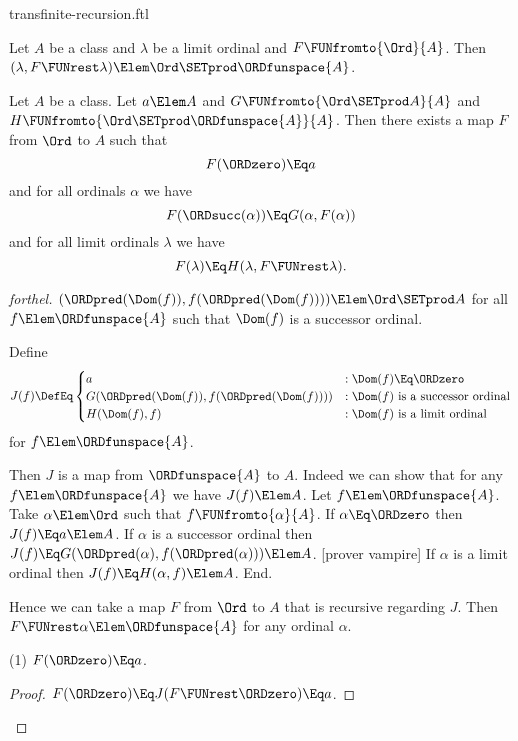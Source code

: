 \documentclass{stex}
\begin{document}
\begin{smodule}{transfinite-recursion.ftl}
\begin{lemma}[forthel]
  Let $A$ be a class and $\lambda$ be a limit ordinal and $F \FUNfromto{\Ord}{A}$.
  Then $(\lambda, F \FUNrest \lambda) \Elem \Ord \SETprod \ORDfunspace{A}$.
\end{lemma}

\begin{corollary}[forthel]
  Let $A$ be a class.
  Let $a \Elem A$ and $G \FUNfromto{\Ord \SETprod A}{A}$ and\linebreak $H \FUNfromto{\Ord \SETprod \ORDfunspace{A}}{A}$.
  Then there exists a map $F$ from $\Ord$ to $A$ such that
  \[ F(\ORDzero) \Eq a \]
  and for all ordinals $\alpha$ we have
  \[ F(\ORDsucc(\alpha)) \Eq G(\alpha, F(\alpha)) \]
  and for all limit ordinals $\lambda$ we have
  \[ F(\lambda) \Eq H(\lambda, F \FUNrest \lambda). \]
\end{corollary}
\begin{proof}[forthel]
  $(\ORDpred(\Dom(f)), f(\ORDpred(\Dom(f)))) \Elem \Ord \SETprod A$ for all $f \Elem \ORDfunspace{A}$ such that $\Dom(f)$ is a successor ordinal.

  Define  \[ J(f) \DefEq
    \begin{cases}
      a
      & : \Dom(f) \Eq \ORDzero
      \\
      G(\ORDpred(\Dom(f)), f(\ORDpred(\Dom(f))))
      & : \text{$\Dom(f)$ is a successor ordinal}
      \\
      H(\Dom(f), f)
      & : \text{$\Dom(f)$ is a limit ordinal}
    \end{cases} \]
  for $f \Elem \ORDfunspace{A}$.

  Then $J$ is a map from $\ORDfunspace{A}$ to $A$.
  Indeed we can show that for any $f \Elem \ORDfunspace{A}$ we have $J(f) \Elem A$.
    Let $f \Elem \ORDfunspace{A}$.
    Take $\alpha \Elem \Ord$ such that $f \FUNfromto{\alpha}{A}$.
    If $\alpha \Eq \ORDzero$ then $J(f) \Eq a \Elem A$.
    If $\alpha$ is a successor ordinal then $J(f) \Eq\linebreak G(\ORDpred(\alpha), f(\ORDpred(\alpha))) \Elem A$.
    [prover vampire]
    If $\alpha$ is a limit ordinal then $J(f) \Eq H(\alpha, f) \Elem A$.
  End.

  Hence we can take a map $F$ from $\Ord$ to $A$ that is recursive regarding $J$.
  Then $F \FUNrest \alpha \Elem \ORDfunspace{A}$ for any ordinal $\alpha$.

  (1) $F(\ORDzero) \Eq a$.
  \begin{proof}
    $F(\ORDzero)
      \Eq J(F \FUNrest \ORDzero)
      \Eq a$.
  \end{proof}


\end{proof}
\end{smodule}
\end{document}
